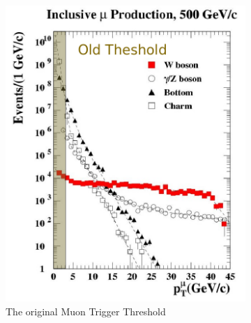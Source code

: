 \begin{figure}[ht]
  \centering
  \begin{subfigure}[b]{0.5\textwidth}
    \centering
    \includegraphics[width=\textwidth]{./figures/w_old_trigger.png}
    \caption{The original Muon Trigger Threshold}
    \label{fig:trig_muon_old}
  \end{subfigure}%
  ~
  \begin{subfigure}[b]{0.5\textwidth}
    \centering

\end{subfigure}
\end{figure}
